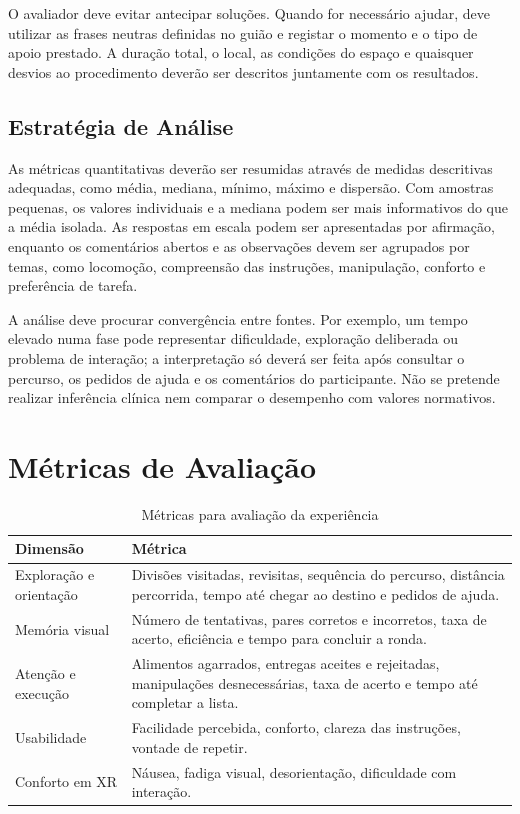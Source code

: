 \documentclass[12pt,a4paper,oneside]{report}
\begin{document}
O avaliador deve evitar antecipar soluções. Quando for necessário ajudar, deve utilizar as frases neutras definidas no guião e registar o momento e o tipo de apoio prestado. A duração total, o local, as condições do espaço e quaisquer desvios ao procedimento deverão ser descritos juntamente com os resultados.

\subsection{Estratégia de Análise}

As métricas quantitativas deverão ser resumidas através de medidas descritivas adequadas, como média, mediana, mínimo, máximo e dispersão. Com amostras pequenas, os valores individuais e a mediana podem ser mais informativos do que a média isolada. As respostas em escala podem ser apresentadas por afirmação, enquanto os comentários abertos e as observações devem ser agrupados por temas, como locomoção, compreensão das instruções, manipulação, conforto e preferência de tarefa.

A análise deve procurar convergência entre fontes. Por exemplo, um tempo elevado numa fase pode representar dificuldade, exploração deliberada ou problema de interação; a interpretação só deverá ser feita após consultar o percurso, os pedidos de ajuda e os comentários do participante. Não se pretende realizar inferência clínica nem comparar o desempenho com valores normativos.

\section{Métricas de Avaliação}

\begin{table}[H]
\centering
\caption{Métricas para avaliação da experiência}
\begin{tabular}{p{4cm}p{9cm}}
\toprule
\textbf{Dimensão} & \textbf{Métrica} \\
\midrule
Exploração e orientação & Divisões visitadas, revisitas, sequência do percurso, distância percorrida, tempo até chegar ao destino e pedidos de ajuda. \\
Memória visual & Número de tentativas, pares corretos e incorretos, taxa de acerto, eficiência e tempo para concluir a ronda. \\
Atenção e execução & Alimentos agarrados, entregas aceites e rejeitadas, manipulações desnecessárias, taxa de acerto e tempo até completar a lista. \\
Usabilidade & Facilidade percebida, conforto, clareza das instruções, vontade de repetir. \\
Conforto em XR & Náusea, fadiga visual, desorientação, dificuldade com interação. \\
\bottomrule
\end{tabular}
\end{table}
\end{document}
